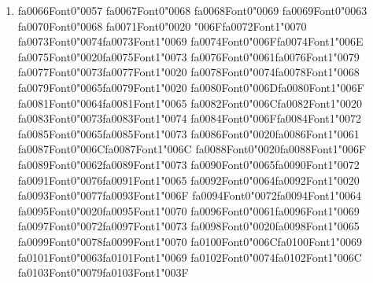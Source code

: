 \documentclass[12pt]{article}
\begin{document}
\begin{enumerate}[label=Q\arabic*.]
 \item {\csname fa0066Font0\endcsname\char"0057} {\csname fa0067Font0\endcsname\char"0068} {\csname fa0068Font0\endcsname\char"0069} {\csname fa0069Font0\endcsname\char"0063} {\csname fa0070Font0\endcsname\char"0068} {\csname fa0071Font0\endcsname\char"0020} {\char"006F}{\csname fa0072Font1\endcsname\char"0070} {\csname fa0073Font0\endcsname\char"0074}{\csname fa0073Font1\endcsname\char"0069} {\csname fa0074Font0\endcsname\char"006F}{\csname fa0074Font1\endcsname\char"006E} {\csname fa0075Font0\endcsname\char"0020}{\csname fa0075Font1\endcsname\char"0073} {\csname fa0076Font0\endcsname\char"0061}{\csname fa0076Font1\endcsname\char"0079} {\csname fa0077Font0\endcsname\char"0073}{\csname fa0077Font1\endcsname\char"0020} {\csname fa0078Font0\endcsname\char"0074}{\csname fa0078Font1\endcsname\char"0068} {\csname fa0079Font0\endcsname\char"0065}{\csname fa0079Font1\endcsname\char"0020} {\csname fa0080Font0\endcsname\char"006D}{\csname fa0080Font1\endcsname\char"006F} {\csname fa0081Font0\endcsname\char"0064}{\csname fa0081Font1\endcsname\char"0065} {\csname fa0082Font0\endcsname\char"006C}{\csname fa0082Font1\endcsname\char"0020} {\csname fa0083Font0\endcsname\char"0073}{\csname fa0083Font1\endcsname\char"0074} {\csname fa0084Font0\endcsname\char"006F}{\csname fa0084Font1\endcsname\char"0072} {\csname fa0085Font0\endcsname\char"0065}{\csname fa0085Font1\endcsname\char"0073} {\csname fa0086Font0\endcsname\char"0020}{\csname fa0086Font1\endcsname\char"0061} {\csname fa0087Font0\endcsname\char"006C}{\csname fa0087Font1\endcsname\char"006C} {\csname fa0088Font0\endcsname\char"0020}{\csname fa0088Font1\endcsname\char"006F} {\csname fa0089Font0\endcsname\char"0062}{\csname fa0089Font1\endcsname\char"0073} {\csname fa0090Font0\endcsname\char"0065}{\csname fa0090Font1\endcsname\char"0072} {\csname fa0091Font0\endcsname\char"0076}{\csname fa0091Font1\endcsname\char"0065} {\csname fa0092Font0\endcsname\char"0064}{\csname fa0092Font1\endcsname\char"0020} {\csname fa0093Font0\endcsname\char"0077}{\csname fa0093Font1\endcsname\char"006F} {\csname fa0094Font0\endcsname\char"0072}{\csname fa0094Font1\endcsname\char"0064} {\csname fa0095Font0\endcsname\char"0020}{\csname fa0095Font1\endcsname\char"0070} {\csname fa0096Font0\endcsname\char"0061}{\csname fa0096Font1\endcsname\char"0069} {\csname fa0097Font0\endcsname\char"0072}{\csname fa0097Font1\endcsname\char"0073} {\csname fa0098Font0\endcsname\char"0020}{\csname fa0098Font1\endcsname\char"0065} {\csname fa0099Font0\endcsname\char"0078}{\csname fa0099Font1\endcsname\char"0070} {\csname fa0100Font0\endcsname\char"006C}{\csname fa0100Font1\endcsname\char"0069} {\csname fa0101Font0\endcsname\char"0063}{\csname fa0101Font1\endcsname\char"0069} {\csname fa0102Font0\endcsname\char"0074}{\csname fa0102Font1\endcsname\char"006C} {\csname fa0103Font0\endcsname\char"0079}{\csname fa0103Font1\endcsname\char"003F}

\end{enumerate}
\end{document}
